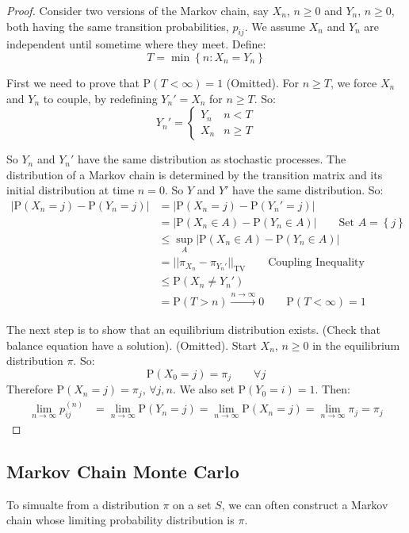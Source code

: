\documentclass[english,12pt]{article}
\theoremstyle{plain}
\theoremstyle{definition}
\theoremstyle{definition} %
\newcommand{\prf}[1]{\begin{proof} #1 \end{proof} }
\newcommand{\curlybrac}[1]{\left\{#1\right\}} %
\newcommand{\p}[1]{\mbox{P} \left( #1 \right)}
\begin{document}
\prf{
Consider two versions of the Markov chain, say $X_n$, $n\ge 0$ and $Y_n$, $n\ge 0$, both having the same transition probabilities, $p_{ij}$.  We assume $X_n$ and $Y_n$ are independent until sometime where they meet.  Define:
\[T=\min\curlybrac{n:X_n=Y_n}\]

First we need to prove that $\p{T<\infty}=1$ (Omitted).  For $n\ge T$, we force $X_n$ and $Y_n$ to couple, by redefining $Y_n'=X_n$ for $n\ge T$.  So:
\[Y_n'=\begin{cases}Y_n & n<T\\ X_n & n\ge T\end{cases}\]

So $Y_n$ and $Y_n'$ have the same distribution as stochastic processes.  The distribution of a Markov chain is determined by the transition matrix and its initial distribution at time $n=0$.  So $Y$ and $Y'$ have the same distribution.  So:
\begin{align*}
|\p{X_n=j}-\p{Y_n=j}|&=|\p{X_n=j}-\p{Y_n'=j}|\\
&=|\p{X_n\in A}-\p{Y_n\in A}|\qquad \text{Set }A=\curlybrac{j}\\
&\le\sup_{A}|\p{X_n\in A}-\p{Y_n\in A}|\\
&=||\pi_{X_n}-\pi_{Y_n'}||_{\text{TV}}\qquad \text{Coupling Inequality}\\
&\le \p{X_n\ne Y_n'}\\
&=\p{T>n}\xrightarrow{n\to\infty}0\qquad \p{T<\infty}=1
\end{align*}

The next step is to show that an equilibrium distribution exists.  (Check that balance equation have a solution).  (Omitted).  Start $X_n$, $n\ge 0$ in the equilibrium distribution $\pi$.  So:
\[\p{X_0=j}=\pi_j\qquad \forall j\]
Therefore $\p{X_n=j}=\pi_j$, $\forall j,n$.  We also set $\p{Y_0=i}=1$.  Then:
\begin{align*}
\lim_{n\to\infty}p_{ij}^{(n)}
&=\lim_{n\to\infty}\p{Y_n=j}
=\lim_{n\to\infty}\p{X_n=j}
=\lim_{n\to\infty}\pi_j
=\pi_j
\end{align*}
}

\subsection{Markov Chain Monte Carlo}
To simualte from a distribution $\pi$ on a set $S$, we can often construct a Markov chain whose limiting probability distribution is $\pi$.
\end{document}
